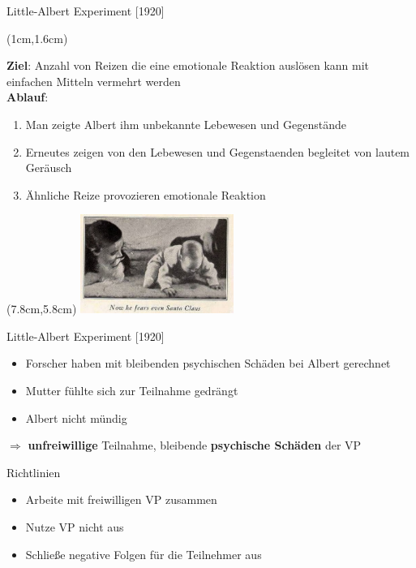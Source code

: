 \documentclass[10pt]{beamer}
\begin{document}
	
		\begin{frame}{Little-Albert Experiment [1920]}
			
			\begin{textblock*}{10cm}(1cm,1.6cm) %
			
			\textbf{Ziel}: Anzahl von Reizen die eine emotionale Reaktion auslösen kann mit einfachen Mitteln vermehrt werden\\

			\textbf{Ablauf}:
			\begin{enumerate}
				\item Man zeigte Albert ihm unbekannte Lebewesen und Gegenstände
				\item Erneutes zeigen von den Lebewesen und Gegenstaenden begleitet von lautem Geräusch
				\item Ähnliche Reize provozieren emotionale Reaktion
			\end{enumerate}
			
		\end{textblock*}
			\begin{textblock*}{5cm}(7.8cm,5.8cm) %
				\includegraphics[width=5cm]{./pics/Little-albert.jpg}
			\end{textblock*}
		\end{frame}
	
	\begin{frame}{Little-Albert Experiment [1920]}
		
		\begin{itemize}
			\item Forscher haben mit bleibenden psychischen Schäden bei Albert gerechnet
			\item Mutter fühlte sich zur Teilnahme gedrängt
			\item Albert nicht mündig
		\end{itemize}
		$\Rightarrow$ \textbf{unfreiwillige} Teilnahme, bleibende \textbf{psychische Schäden} der VP
	\end{frame}

	
	\begin{frame}{Richtlinien}
		
		\begin{itemize}
			\item Arbeite mit freiwilligen VP zusammen
			\item Nutze VP nicht aus
			\item Schließe negative Folgen für die Teilnehmer aus
		\end{itemize}
		
	\end{frame}
	
\end{document}
